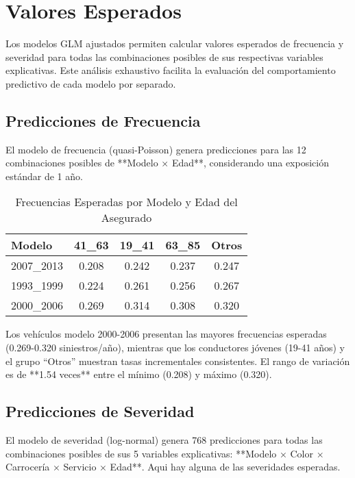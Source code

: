 \section{Valores Esperados}

Los modelos GLM ajustados permiten calcular valores esperados de frecuencia y severidad para todas las combinaciones posibles de sus respectivas variables explicativas. Este análisis exhaustivo facilita la evaluación del comportamiento predictivo de cada modelo por separado.

\subsection{Predicciones de Frecuencia}

El modelo de frecuencia (quasi-Poisson) genera predicciones para las 12 combinaciones posibles de **Modelo × Edad**, considerando una exposición estándar de 1 año.

\begin{table}[H]
\centering
\caption{Frecuencias Esperadas por Modelo y Edad del Asegurado}
\begin{tabular}{|l|c|c|c|c|}
\hline
\textbf{Modelo} & \textbf{41\_63} & \textbf{19\_41} & \textbf{63\_85} & \textbf{Otros} \\
\hline
2007\_2013 & 0.208 & 0.242 & 0.237 & 0.247 \\
1993\_1999 & 0.224 & 0.261 & 0.256 & 0.267 \\
2000\_2006 & 0.269 & 0.314 & 0.308 & 0.320 \\
\hline
\end{tabular}
\end{table}

Los vehículos modelo 2000-2006 presentan las mayores frecuencias esperadas (0.269-0.320 siniestros/año), mientras que los conductores jóvenes (19-41 años) y el grupo ``Otros'' muestran tasas incrementales consistentes. El rango de variación es de **1.54 veces** entre el mínimo (0.208) y máximo (0.320).

\subsection{Predicciones de Severidad}

El modelo de severidad (log-normal) genera 768 predicciones para todas las combinaciones posibles de sus 5 variables explicativas: **Modelo × Color × Carrocería × Servicio × Edad**. Aqui hay alguna de las severidades esperadas.

